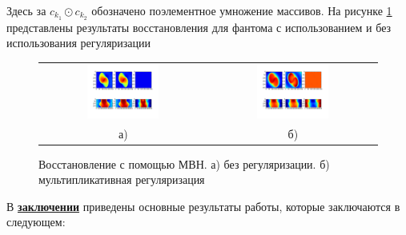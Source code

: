 Здесь за $c_{k_1} \odot c_{k_2}$ обозначено поэлементное умножение массивов.
На рисунке \ref{fig:whiteres} представлены результаты восстановления для фантома с использованием и без использования регуляризации
\begin{figure}
\label{fig:whiteres}
\centering
\begin{tabular}{@{}c@{}c}
  \includegraphics[width=0.45\textwidth]{Dissertation/images/part3_img/no_reg_iteration_25} &
  \includegraphics[width=0.45\textwidth]{Dissertation/images/part3_img/mul_reg_iteration_150}
  \\
  а) &
  б)
\end{tabular}
\caption{Восстановление с помощью МВН. а) без регуляризации. б) мультипликативная регуляризация}
\end{figure}


В \underline{\textbf{заключении}} приведены основные результаты работы, которые заключаются в следующем:

